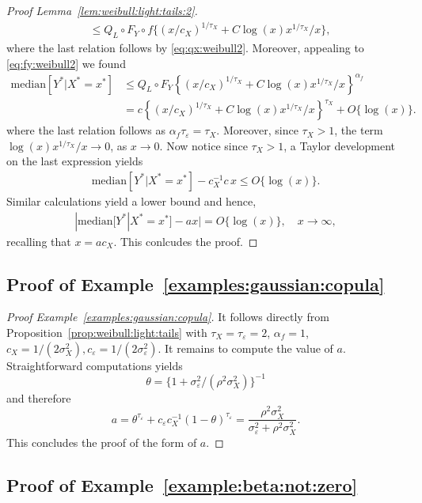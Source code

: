 \documentclass{statsoc}
\theoremstyle{break}
\newcommand{\eps}{\varepsilon}
\def\M{\text{median}}
\newcommand{\beao}{\begin{eqnarray*}}
\newcommand{\eeao}{\end{eqnarray*}\noindent}
\begin{document}
\begin{proof}[Proof Lemma~\ref{lem:weibull:light:tails:2}]
\begin{align*}
		&\leq Q_L \circ F_Y \circ f \{(x/c_X)^{1/\tau_X} + C \log(x) x^{1/\tau_X}/x \},
\end{align*}
where the last relation follows by \eqref{eq:qx:weibull2}. Moreover, appealing to \eqref{eq:fy:weibull2} we found 
\begin{align*} 		
		\M[Y^* | X^* = x^*]  & \leq   Q_L \circ F_Y \left\{ (x/c_X)^{1/\tau_X} + C \log(x) x^{1/\tau_X}/x \right\}^{\alpha_f} \\
		&= c \left\{ (x/c_X)^{1/\tau_X} + C \log(x) x^{1/\tau_X}/x \right\}^{\tau_X}  + O\{\log(x)\}.
\end{align*} 
where the last relation follows as $\alpha_f \tau_\varepsilon = \tau_X$. 
Moreover, since $\tau_X > 1$, the term $\log(x) x^{1/\tau_X}/x \to 0$, as $x \to 0$. Now notice since $\tau_X > 1$, a Taylor development on the last expression yields 
\beao 
		\M[Y^* | X^* = x^*]  	- c_X^{-1} c \, x \leq O\{\log(x)\}.
\eeao 
Similar calculations yield a lower bound and hence, 
\beao 
		|\M[Y^* | X^* = x^*]  	- a x| = O\{ \log(x)\}, \quad x \to \infty,
\eeao 
recalling that $x = ac_X$.
This conlcudes the proof.  
\end{proof} 


\subsection{Proof of Example~\ref{examples:gaussian:copula}}

\begin{proof}[Proof Example~\ref{examples:gaussian:copula}]
	It follows directly from Proposition~\ref{prop:weibull:light:tails} with $\tau_X = \tau_\varepsilon = 2$, $\alpha_f = 1$, $c_X = 1/(2\sigma_X^2), c_\varepsilon = 1/(2\sigma_\varepsilon^2)$. It remains to	 compute the value of $a$. Straightforward computations yields
	\[\theta = \{1 + \sigma_\varepsilon^2/(\rho^2\sigma_X^2)\}^{-1} \]
	and therefore
	\[a =  \theta^{\tau_\eps} +  c_{\varepsilon} c_X^{-1}  (1-\theta)^{\tau_\eps}  = \frac{\rho^2\sigma_X^2}{\sigma_\eps^2 + \rho^2\sigma_X^2} .\]
	This concludes the proof of the form of $a$.
	\end{proof}


\subsection{Proof of Example~\ref{example:beta:not:zero}}\label{lem:last:example}
\end{document}
